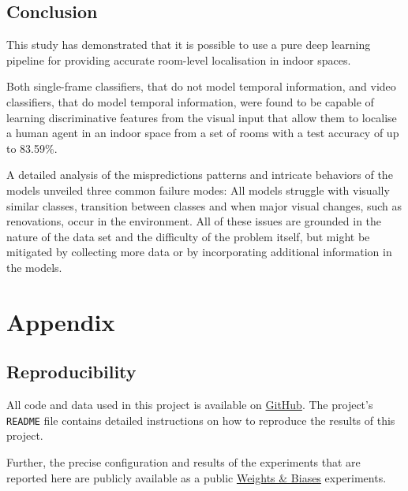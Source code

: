 \documentclass[a4paper]{article}
\begin{document}
\subsection{Conclusion} %
\label{sub:conclusion}

This study has demonstrated that it is possible to use a pure deep learning
pipeline for providing accurate room-level localisation in indoor spaces.

Both single-frame classifiers, that do not model temporal information, and video
classifiers, that do model temporal information, were found to be capable of
learning discriminative features from the visual input that allow them to
localise a human agent in an indoor space from a set of rooms with a test
accuracy of up to 83.59\%.

A detailed analysis of the mispredictions patterns and intricate behaviors of
the models unveiled three common failure modes: All models struggle with
visually similar classes, transition between classes and when major visual
changes, such as renovations, occur in the environment. All of these issues are
grounded in the nature of the data set and the difficulty of the problem itself,
but might be mitigated by collecting more data or by incorporating additional
information in the models.

\newpage




\newpage
\section{Appendix} %
\label{sec:appendix}

\subsection{Reproducibility} %
\label{sub:reproducibility}

All code and data used in this project is available on
\href{https://github.com/mikasenghaas/bsc}{GitHub}. The project's
\texttt{README} file contains detailed instructions on how to reproduce the
results of this project.

Further, the precise configuration and results of the experiments that are
reported here are publicly available as a public
\href{https://wandb.ai/mikasenghaas/bsc}{Weights \& Biases} experiments.

\end{document}
